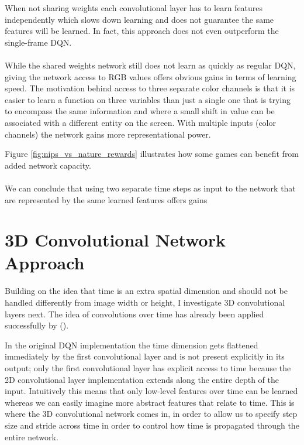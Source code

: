 When not sharing weights each convolutional layer
has to learn features independently which slows down learning
and does not guarantee the same features will be learned.
In fact, this approach does not even outperform
the single-frame DQN.

\paragraph{}
While  the shared weights network
still does not learn as quickly as regular DQN,
giving the network access to RGB values offers obvious gains
in terms of learning speed.
The motivation behind access to three separate color channels
is that it is easier to learn a function on three variables
than just a single one
that is trying to encompass the same information
and where a small shift in value can be associated
with a different entity on the screen.
With multiple inputs (color channels)
the network gains more representational power.

Figure \ref{fig:nips_vs_nature_rewards}
illustrates how some games can benefit
from added network capacity.

\paragraph{}
We can conclude that using two separate time steps
as input to the network
that are represented by the same learned features
offers gains

\section{3D Convolutional Network Approach}
\label{sec:3d_convolutional_network_approach}
Building on the idea that time is an extra spatial dimension
and should not be handled differently
from image width or height,
I investigate 3D convolutional layers next.
The idea of convolutions over time has already been
applied successfully by \citeauthor{claessens} (\citeyear{claessens}).

In the original DQN implementation
the time dimension gets flattened immediately
by the first convolutional layer
and is not present explicitly
in its output;
only the first convolutional layer
has explicit access to time
because the 2D convolutional layer implementation
extends along the entire depth of the input.
Intuitively this means that only low-level
features over time can be learned
whereas we can easily imagine
more abstract features
that relate to time.
This is where the 3D convolutional network comes in,
in order to allow us to specify step size and stride across time
in order to control how time is propagated through the entire network.


